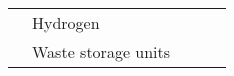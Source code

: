 \begin{table}[]
\begin{tabular}{@{}lllll@{}}
                                                                                                 & Hydrogen                                                                                              &                                                                                                      &                                                                                              &                                                                                                                                                                                                                                                                                                                                                                                                                                                                                                                                                                                                                                                                                                                                                                                                                                                                                                                           \\
                                                                                                 & \multirow{2}{*}{Waste storage units}                                                                  &                                                                                                      &                                                                                              &                                                                                                                                                                                                                                                                                                                                                                                                                                                                                                                                                                                                                                                                                                                                                                                                                                                                                                                           \\

\end{tabular}
\end{table}

